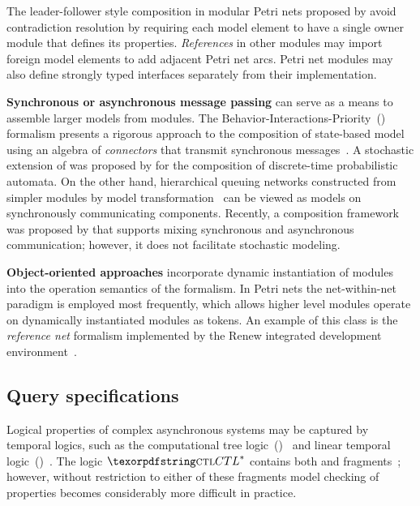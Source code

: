 The leader-follower style composition in modular Petri nets proposed by \citet{Kindler09modular} avoid contradiction resolution by requiring each model element to have a single owner module that defines its properties. \emph{References} in other modules may import foreign model elements to add adjacent Petri net arcs. Petri net modules may also define strongly typed interfaces separately from their implementation.

\newpara \textbf{Synchronous or asynchronous message passing} can serve as a means to assemble larger models from modules. The Behavior-Interactions-Priority~() formalism presents a rigorous approach to the composition of state-based model using an algebra of \emph{connectors} that transmit synchronous messages~\citep{Basu06bip}. A stochastic extension of  was proposed by \citet{Nouri15sbip} for the composition of discrete-time probabilistic automata. On the other hand, hierarchical queuing networks constructed from simpler modules by model transformation~ can be viewed as models on synchronously communicating components. Recently, a composition framework was proposed by \citet{Graics17theta} that supports mixing synchronous and asynchronous communication; however, it does not facilitate stochastic modeling.

\newpara \textbf{Object-oriented approaches} incorporate dynamic instantiation of modules into the operation semantics of the formalism. In Petri nets the net-within-net paradigm is employed most frequently, which allows higher level modules operate on dynamically instantiated modules as tokens. An example of this class is the \emph{reference net} formalism implemented by the Renew integrated development environment~\citep{Cabac16renew}.

\subsection{Query specifications}
\label{ssec:rgspn:relwork-query}

Logical properties of complex asynchronous systems may be captured by temporal logics, such as the computational tree logic~()~\citep{Clarke81ctl} and linear temporal logic~()~\citep{Vardi96ltl}. The logic \(\textabbr{CTL}^*\) contains both  and  fragments~\citep{Emerson86ctlstar}; however, without restriction to either of these fragments model checking of properties becomes considerably more difficult in practice.

